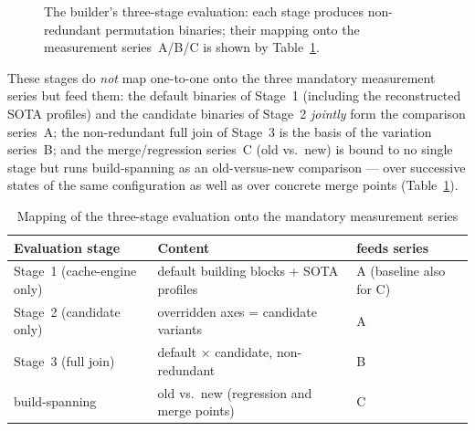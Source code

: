 \begin{nurlang}
\begin{figure}[!htbp]
  \centering
  \caption{The builder's three-stage evaluation: each stage produces non-redundant
  permutation binaries; their mapping onto the measurement series~A/B/C is shown by
  Table~\ref{tab:stage-series}.}\label{fig:three-stage}
\end{figure}

These stages do \emph{not} map one-to-one onto the three mandatory measurement series but feed them: the
default binaries of Stage~1 (including the reconstructed SOTA profiles) and the candidate binaries of
Stage~2 \emph{jointly} form the comparison series~A\@; the non-redundant full join of Stage~3 is
the basis of the variation series~B\@; and the merge/regression series~C (old vs.\ new) is bound to
no single stage but runs build-spanning as an old-versus-new comparison --- over
successive states of the same configuration as well as over concrete merge points
(Table~\ref{tab:stage-series}).

\begin{table}[!htbp]
  \centering
  \caption{Mapping of the three-stage evaluation onto the mandatory measurement series}\label{tab:stage-series}
  \begin{tabular}{@{}lll@{}}
    \toprule
    \textbf{Evaluation stage} & \textbf{Content} & \textbf{feeds series} \\
    \midrule
    Stage~1 (cache-engine only) & default building blocks + SOTA profiles & A (baseline also for C) \\
    Stage~2 (candidate only) & overridden axes = candidate variants & A \\
    Stage~3 (full join) & default $\times$ candidate, non-redundant & B \\
    build-spanning & old vs.\ new (regression and merge points) & C \\
    \bottomrule
  \end{tabular}


\end{table}
\end{nurlang}
